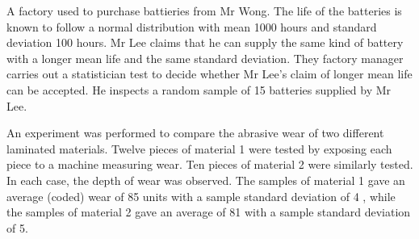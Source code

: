 \documentclass[letterpaper,10pt,addpoints]{exam}
\begin{document}
\begin{questions}
\question
A factory used to purchase battieries from $\mathrm{Mr}$ Wong. The life of the batteries is known to follow a normal distribution with mean 1000 hours and standard deviation 100 hours. Mr Lee claims that he can supply the same kind of battery with a longer mean life and the same standard deviation. They factory manager carries out a statistician test to decide whether Mr Lee's claim of longer mean life can be accepted. He inspects a random sample of 15 batteries supplied by Mr Lee.

\question

An experiment was performed to compare the abrasive wear of two different laminated materials. Twelve pieces of material 1 were tested by exposing each piece to a machine measuring wear. Ten pieces of material 2 were similarly tested. In each case, the depth of wear was observed. The samples of material 1 gave an average (coded) wear of 85 units with a sample standard deviation of 4 , while the samples of material 2 gave an average of 81 with a sample standard deviation of 5. 

\end{questions}
\end{document}
